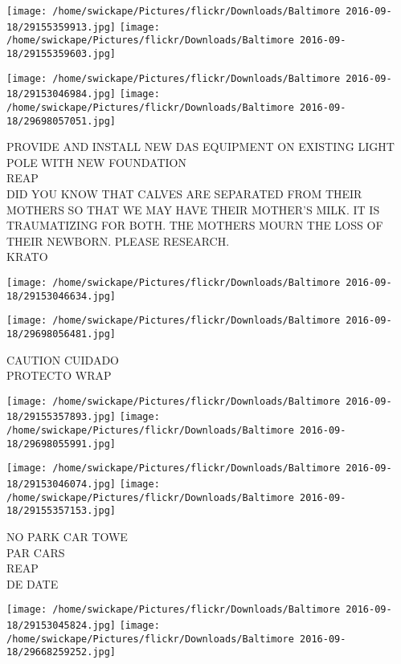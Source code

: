 \documentclass[10pt,letterpaper]{article}
\begin{document}
\texttt{[image: /home/swickape/Pictures/flickr/Downloads/Baltimore 2016-09-18/29155359913.jpg]}
\texttt{[image: /home/swickape/Pictures/flickr/Downloads/Baltimore 2016-09-18/29155359603.jpg]}

\texttt{[image: /home/swickape/Pictures/flickr/Downloads/Baltimore 2016-09-18/29153046984.jpg]}
\texttt{[image: /home/swickape/Pictures/flickr/Downloads/Baltimore 2016-09-18/29698057051.jpg]}

PROVIDE AND INSTALL NEW DAS EQUIPMENT ON EXISTING LIGHT POLE WITH NEW FOUNDATION\\
REAP\\
DID YOU KNOW THAT CALVES ARE SEPARATED FROM THEIR MOTHERS SO THAT WE MAY HAVE THEIR MOTHER'S MILK.  IT IS TRAUMATIZING FOR BOTH.  THE MOTHERS MOURN THE LOSS OF THEIR NEWBORN.  PLEASE RESEARCH.\\
KRATO\\
\pagebreak

\texttt{[image: /home/swickape/Pictures/flickr/Downloads/Baltimore 2016-09-18/29153046634.jpg]}

\vspace{0.25in}
\texttt{[image: /home/swickape/Pictures/flickr/Downloads/Baltimore 2016-09-18/29698056481.jpg]}

CAUTION CUIDADO\\
PROTECTO WRAP\\
\pagebreak

\texttt{[image: /home/swickape/Pictures/flickr/Downloads/Baltimore 2016-09-18/29155357893.jpg]}
\texttt{[image: /home/swickape/Pictures/flickr/Downloads/Baltimore 2016-09-18/29698055991.jpg]}

\texttt{[image: /home/swickape/Pictures/flickr/Downloads/Baltimore 2016-09-18/29153046074.jpg]}
\texttt{[image: /home/swickape/Pictures/flickr/Downloads/Baltimore 2016-09-18/29155357153.jpg]}

NO PARK CAR TOWE\\
PAR CARS\\
REAP\\
DE DATE\\
\pagebreak

\texttt{[image: /home/swickape/Pictures/flickr/Downloads/Baltimore 2016-09-18/29153045824.jpg]}
\texttt{[image: /home/swickape/Pictures/flickr/Downloads/Baltimore 2016-09-18/29668259252.jpg]}
\end{document}
